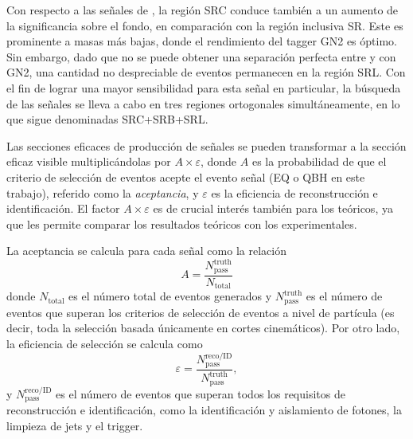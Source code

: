 Con respecto a las señales de \cstar, la región SRC conduce también a un aumento de la significancia sobre el fondo, en comparación con la región inclusiva SR. Este es prominente a masas más bajas, donde el rendimiento del tagger GN2 es óptimo.
Sin embargo, dado que no se puede obtener una separación perfecta entre \cquarks y \lquarks con GN2, una cantidad no despreciable de eventos \cstar permanecen en la región \ltagged SRL. Con el fin de lograr una mayor sensibilidad para esta señal en particular, la búsqueda de las señales \cstar se lleva a cabo en tres regiones ortogonales simultáneamente, en lo que sigue denominadas SRC+SRB+SRL.


Las secciones eficaces de producción de señales se pueden transformar a la sección eficaz visible multiplicándolas por \(A \times \varepsilon\), donde \(A\) es la probabilidad de que el criterio de selección de eventos acepte el evento señal (\ac{EQ} o \ac{QBH} en este trabajo), referido como la \textit{aceptancia}, y \(\varepsilon\) es la eficiencia de reconstrucción e identificación. El factor \(A \times \varepsilon\) es de crucial interés también para los teóricos, ya que les permite comparar los resultados teóricos con los experimentales.

La aceptancia se calcula para cada señal como la relación
\begin{equation}
    A = \frac{N^{\text{truth}}_{\text{pass}}}{N_{\text{total}}}
\end{equation}
donde \(N_{\text{total}}\) es el número total de eventos generados y \(N^{\text{truth}}_{\text{pass}}\) es el número de eventos que superan los criterios de selección de eventos a nivel de partícula (es decir, toda la selección basada únicamente en cortes cinemáticos). Por otro lado, la eficiencia de selección se calcula como
\begin{equation}
    \varepsilon = \frac{N^{\text{reco/ID}}_{\text{pass}}}{N^{\text{truth}}_{\text{pass}}},
\end{equation}
y \(N^{\text{reco/ID}}_{\text{pass}}\) es el número de eventos que superan todos los requisitos de reconstrucción e identificación, como la identificación y aislamiento de fotones, la limpieza de jets y el trigger. 

